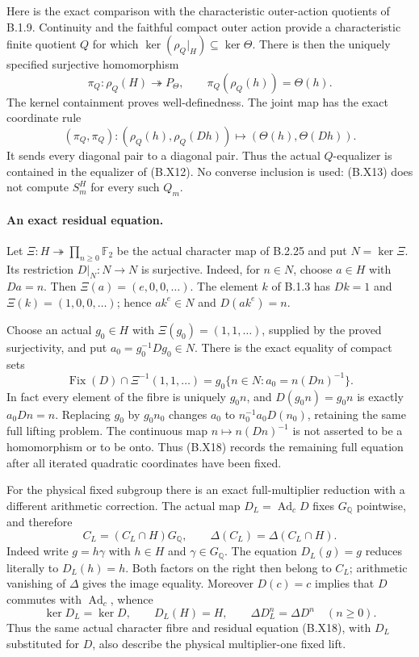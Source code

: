 Here is the exact comparison with the characteristic
outer-action quotients of B.1.9.  Continuity and the
faithful compact outer action provide a characteristic
finite quotient $Q$ for which
$\ker(\rho_Q|_H)\subseteq\ker\Theta$.
There is then the uniquely specified surjective
homomorphism
\[
 \pi_Q:\rho_Q(H)\twoheadrightarrow P_\Theta,
                  \qquad \pi_Q(\rho_Q(h))=\Theta(h).
 \tag{B.X17}
\]
The kernel containment proves well-definedness.
The joint map has the exact coordinate rule
\[
 (\pi_Q,\pi_Q):
 (\rho_Q(h),\rho_Q(Dh))\longmapsto
                    (\Theta(h),\Theta(Dh)).
\]
It sends every diagonal pair to a diagonal pair.
Thus the actual
$Q$-equalizer is contained in the equalizer of
(B.X12).  No converse inclusion is used: (B.X13)
does not compute $S_m^H$ for every such $Q_m$.

\paragraph{An exact residual equation.}
Let $\Xi:H\twoheadrightarrow\prod_{n\ge0}\mathbb F_2$
be the actual character map of B.2.25 and put
$N=\ker\Xi$.  Its restriction $D|_N:N\to N$ is
surjective.  Indeed, for $n\in N$, choose $a\in H$
with $Da=n$.  Then $\Xi(a)=(e,0,0,\ldots)$.
The element $k$ of B.1.3 has $Dk=1$ and
$\Xi(k)=(1,0,0,\ldots)$; hence $ak^e\in N$
and $D(ak^e)=n$.

Choose an actual $g_0\in H$ with
$\Xi(g_0)=(1,1,\ldots)$, supplied by the proved
surjectivity, and put $a_0=g_0^{-1}Dg_0\in N$.
There is the exact equality of compact sets
\[
 \operatorname{Fix}(D)\cap\Xi^{-1}(1,1,\ldots)
 =g_0\{n\in N:a_0=n(Dn)^{-1}\}.
 \tag{B.X18}
\]
In fact every element of the fibre is uniquely $g_0n$,
and $D(g_0n)=g_0n$ is exactly $a_0Dn=n$.
Replacing $g_0$ by $g_0n_0$ changes $a_0$ to
$n_0^{-1}a_0D(n_0)$, retaining the same full lifting
problem.  The continuous map $n\mapsto n(Dn)^{-1}$
is not asserted to be a homomorphism or to be onto.
Thus (B.X18) records the remaining full equation after
all iterated quadratic coordinates have been fixed.

For the physical fixed subgroup there is an exact
full-multiplier reduction with a different arithmetic
correction.  The actual map $D_L=\operatorname{Ad}_cD$
fixes $G_{\mathbb Q}$ pointwise, and therefore
\[
 C_L=(C_L\cap H)G_{\mathbb Q},\qquad
       \Delta(C_L)=\Delta(C_L\cap H).
 \tag{B.X19}
\]
Indeed write $g=h\gamma$ with $h\in H$ and
$\gamma\in G_{\mathbb Q}$.  The equation
$D_L(g)=g$ reduces literally to $D_L(h)=h$.
Both factors on the right then belong to $C_L$;
arithmetic vanishing of $\Delta$ gives the image equality.
Moreover $D(c)=c$ implies that $D$ commutes with
$\operatorname{Ad}_c$, whence
\[
 \ker D_L=\ker D,\qquad D_L(H)=H,
 \qquad \Delta D_L^n=\Delta D^n\quad(n\ge0).
 \tag{B.X20}
\]
Thus the same actual character fibre and residual
equation (B.X18), with $D_L$ substituted for $D$,
also describe the physical multiplier-one fixed lift.
